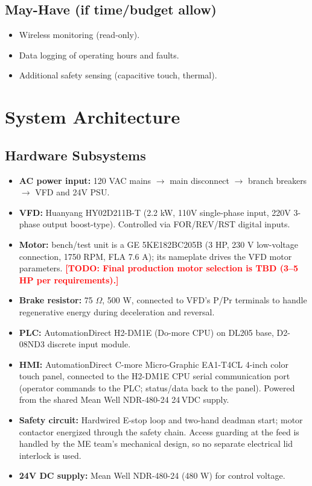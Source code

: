 \documentclass[hidelinks,12pt]{article}
\newcommand{\todo}[1]{\textcolor{red}{\textbf{[TODO: #1]}}}
\begin{document}
\subsection{May-Have (if time/budget allow)}
\begin{itemize}
    \item Wireless monitoring (read-only).
    \item Data logging of operating hours and faults.
    \item Additional safety sensing (capacitive touch, thermal).
\end{itemize}

\section{System Architecture}

\subsection{Hardware Subsystems}
\begin{itemize}
    \item \textbf{AC power input:} 120 VAC mains $\rightarrow$ main disconnect $\rightarrow$ branch breakers $\rightarrow$ VFD and 24V PSU.
    \item \textbf{VFD:} Huanyang HY02D211B-T (2.2 kW, 110V single-phase input, 220V 3-phase output boost-type). Controlled via FOR/REV/RST digital inputs.
    \item \textbf{Motor:} bench/test unit is a GE 5KE182BC205B (3 HP, 230 V low-voltage connection, 1750 RPM, FLA 7.6 A); its nameplate drives the VFD motor parameters. \todo{Final production motor selection is TBD (3--5 HP per requirements).}
    \item \textbf{Brake resistor:} 75 $\Omega$, 500 W, connected to VFD's P/Pr terminals to handle regenerative energy during deceleration and reversal.
    \item \textbf{PLC:} AutomationDirect H2-DM1E (Do-more CPU) on DL205 base, D2-08ND3 discrete input module.
    \item \textbf{HMI:} AutomationDirect C-more Micro-Graphic EA1-T4CL 4-inch color touch panel, connected to the H2-DM1E CPU serial communication port (operator commands to the PLC; status/data back to the panel). Powered from the shared Mean Well NDR-480-24 24\,VDC supply.
    \item \textbf{Safety circuit:} Hardwired E-stop loop and two-hand deadman start; motor contactor energized through the safety chain. Access guarding at the feed is handled by the ME team's mechanical design, so no separate electrical lid interlock is used.
    \item \textbf{24V DC supply:} Mean Well NDR-480-24 (480 W) for control voltage.
\end{itemize}
\end{document}
